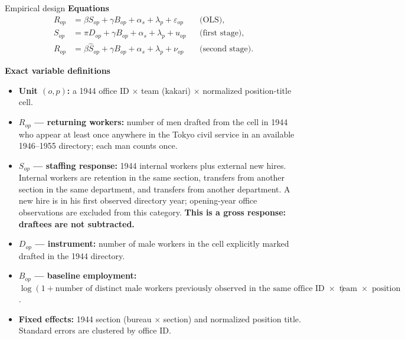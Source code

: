 \documentclass[aspectratio=169]{beamer}
\begin{document}
\begin{frame}{Empirical design}
  \scriptsize
  \textbf{Equations}
  \begin{align*}
    R_{op} &= \beta S_{op}+\gamma B_{op}+\alpha_s+\lambda_p+\varepsilon_{op}
      && \text{(OLS)},\\
    S_{op} &= \pi D_{op}+\gamma B_{op}+\alpha_s+\lambda_p+u_{op}
      && \text{(first stage)},\\
    R_{op} &= \beta \widehat S_{op}+\gamma B_{op}+\alpha_s+\lambda_p+\nu_{op}
      && \text{(second stage)}.
  \end{align*}

  \vspace{-0.7em}
  \textbf{Exact variable definitions}
  \begin{itemize}
    \item \textbf{Unit $(o,p)$:} a 1944 office ID $\times$ team (kakari)
          $\times$ normalized position-title cell.
    \item \textbf{$R_{op}$ --- returning workers:} number of men drafted from
          the cell in 1944 who appear at least once anywhere in the Tokyo civil
          service in an available 1946--1955 directory; each man counts once.
    \item \textbf{$S_{op}$ --- staffing response:} 1944 internal workers plus
          external new hires. Internal workers are retention in the same section,
          transfers from another section in the same department, and transfers
          from another department. A new hire is in his first observed directory
          year; opening-year office observations are excluded from this category.
          \textbf{This is a gross response: draftees are not subtracted.}
    \item \textbf{$D_{op}$ --- instrument:} number of male workers in the cell
          explicitly marked drafted in the 1944 directory.
    \item \textbf{$B_{op}$ --- baseline employment:}
          $\log(1+\text{number of distinct male workers previously observed in
          the same office ID $\times$ team $\times$ position})$.
    \item \textbf{Fixed effects:} 1944 section (bureau $\times$ section) and
          normalized position title. Standard errors are clustered by office ID.
  \end{itemize}
\end{frame}
\end{document}
